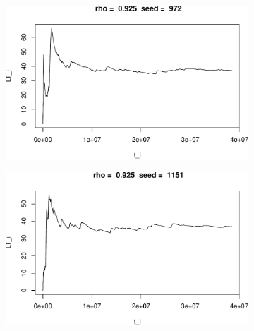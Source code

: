 \documentclass[]{article}
\begin{document}
\begin{figure}[h!]
\begin{subfigure}[b]{.55\linewidth}

\includegraphics[width=\linewidth]{003_files/figure-latex/unnamed-chunk-22-3.pdf}
\end{subfigure}\hfill
\begin{subfigure}[b]{.55\linewidth}
\includegraphics[width=\linewidth]{003_files/figure-latex/unnamed-chunk-22-4.pdf}
\end{subfigure}\vfill
\end{figure}
\end{document}
